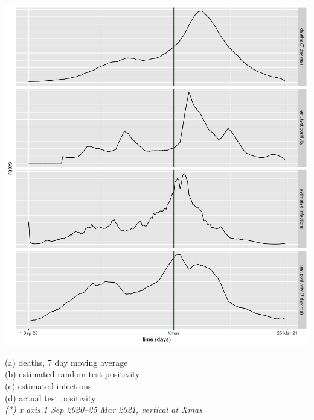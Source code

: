\documentclass[9pt]{report}
\begin{document}
  \includegraphics[height=0.9\textheight]{img/deaths-predict.png}
  \quad 
\begin{minipage}[t]{1.5in}
  \vspace*{-2.15in}\footnotesize 
  (a) deaths, 7 day moving average 
  \\[18pt]
  (b) estimated random test positivity 
  \\[18pt]
  (c) estimated infections 
  \\[30pt]
  (d) actual test positivity 
  \\[12pt]
  {\slshape (*) x axis 1 Sep 2020--25 Mar 2021, vertical at Xmas}
\end{minipage}
\end{document}
